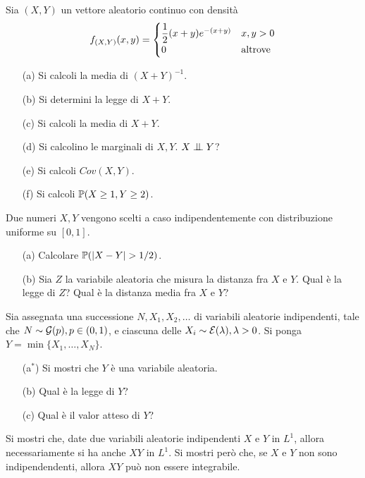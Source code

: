 \Esercizio{}
Sia $(X,Y)$ un vettore aleatorio continuo con densità
\[
f_{(X,Y)}(x,y)=\begin{cases} \dfrac{1}{2}(x+y)e^{-(x+y)} &x,y>0 \\ 0&\text{altrove} \end{cases}
\]
\begin{enumerate}
\item [(a)] Si calcoli la media di $(X+Y)^{-1}$.
\item [(b)] Si determini la legge di $X+Y$.
\item [(c)] Si calcoli la media di $X+Y$.
\item [(d)] Si calcolino le marginali di $X,Y$. $X\indep Y$?
\item [(e)] Si calcoli $Cov(X,Y)$.
\item [(f)] Si calcoli $\mathbb{P}(X\geq 1,Y\geq 2)$.
\end{enumerate}

\Esercizio{} %
Due numeri $X,Y$ vengono scelti a caso indipendentemente con distribuzione uniforme su $[0,1]$.
\begin{enumerate}
\item [(a)] Calcolare $\PP(|X-Y|>1/2)$.
\item [(b)] Sia $Z$ la variabile aleatoria che misura la distanza fra $X$ e $Y$. Qual è la legge di $Z$? Qual è la distanza media fra $X$ e $Y$?
\end{enumerate}

\Esercizio{} %
Sia assegnata una successione $N,X_1,X_2,\dots$ di variabili aleatorie indipendenti, tale che $N\sim\mathcal{G}(p), p\in(0,1)$, e ciascuna delle $X_i\sim\mathcal{E}(\lambda),\lambda>0$. Si ponga $Y=\min\{X_1,\dots,X_N  \}$.
\begin{enumerate}
\item [(a$^*$)] Si mostri che $Y$ è una variabile aleatoria.
\item [(b)] Qual è la legge di $Y$?
\item [(c)] Qual è il valor atteso di $Y$? 
\end{enumerate}

\Esercizio{} %
Si mostri che, date due variabili aleatorie indipendenti $X$ e $Y$ in $L^1$, allora necessariamente si ha anche $XY$ in $L^1$. Si mostri però che, se $X$ e $Y$ non sono indipendendenti, allora $XY$ può non essere integrabile.

